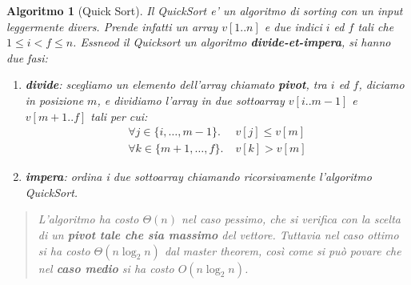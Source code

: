 \documentclass[oneside]{book}
\newtheorem{alg}{Algoritmo}
\begin{document}
\begin{alg}[Quick Sort]
  Il QuickSort e' un algoritmo di sorting con un input leggermente divers. Prende
  infatti un array $v[1..n]$ e due indici $i$ ed $f$ tali che $1 \leq i < f \leq n$.
  Essneod il Quicksort un algoritmo \textbf{divide-et-impera}, si hanno due fasi:
  \begin{enumerate}
    \item \textbf{divide}: scegliamo un elemento dell'array chiamato \textbf{pivot},
      tra $i$ ed $f$, diciamo in posizione $m$, e dividiamo l'array in due
      sottoarray $v[i..m-1]$ e $v[m+1..f]$ tali per cui:
      \begin{align*}
        \forall j \in \{i, \ldots, m-1\}. &\; v[j] \leq v[m] \\
        \forall k \in \{m+1, \ldots, f\}. &\; v[k] > v[m]
      \end{align*}
    \item \textbf{impera}: ordina i due sottoarray chiamando ricorsivamente
      l'algoritmo QuickSort.
  \end{enumerate}

  \begin{algorithm}[H]

  \end{algorithm}

  \begin{algorithm}[H]

    \;
  \end{algorithm}
  \begin{quote}
    L'algoritmo ha costo $\Theta(n)$ nel caso pessimo, che si verifica con la scelta
    di un \textbf{pivot tale che sia massimo} del vettore.
    Tuttavia nel caso ottimo si ha costo $\Theta(n \log_2 n)$ dal master theorem,
    cos\`i come si pu\`o povare che nel \textbf{caso medio} si ha costo $O(n \log_2 n)$.


\end{quote}
\end{alg}
\end{document}
